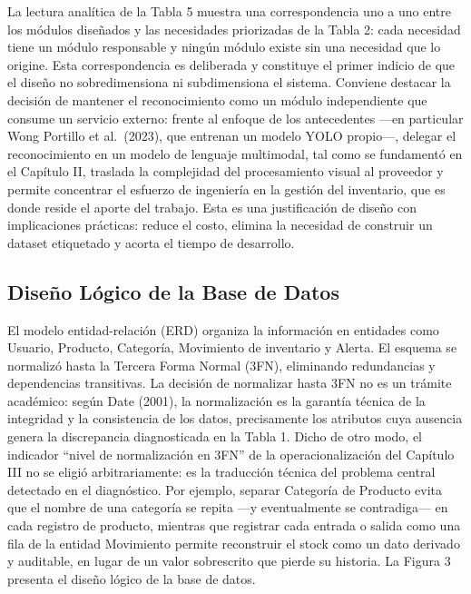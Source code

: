 \documentclass[12pt, letterpaper]{report}
\begin{document}
\vspace{6pt}

La lectura analítica de la Tabla 5 muestra una correspondencia uno a
uno entre los módulos diseñados y las necesidades priorizadas de la
Tabla 2: cada necesidad tiene un módulo responsable y ningún módulo
existe sin una necesidad que lo origine. Esta correspondencia es
deliberada y constituye el primer indicio de que el diseño no
sobredimensiona ni subdimensiona el sistema. Conviene destacar la
decisión de mantener el reconocimiento como un módulo independiente que
consume un servicio externo: frente al enfoque de los antecedentes
---en particular Wong Portillo et al.\ (2023), que entrenan un modelo
YOLO propio---, delegar el reconocimiento en un modelo de lenguaje
multimodal, tal como se fundamentó en el Capítulo II, traslada la
complejidad del procesamiento visual al proveedor y permite concentrar
el esfuerzo de ingeniería en la gestión del inventario, que es donde
reside el aporte del trabajo. Esta es una justificación de diseño con
implicaciones prácticas: reduce el costo, elimina la necesidad de
construir un dataset etiquetado y acorta el tiempo de desarrollo.

\subsection{Diseño Lógico de la Base de Datos}

El modelo entidad-relación (ERD) organiza la información en entidades
como Usuario, Producto, Categoría, Movimiento de inventario y Alerta.
El esquema se normalizó hasta la Tercera Forma Normal (3FN),
eliminando redundancias y dependencias transitivas. La decisión de
normalizar hasta 3FN no es un trámite académico: según Date (2001), la
normalización es la garantía técnica de la integridad y la consistencia
de los datos, precisamente los atributos cuya ausencia genera la
discrepancia diagnosticada en la Tabla 1. Dicho de otro modo, el
indicador ``nivel de normalización en 3FN'' de la operacionalización
del Capítulo III no se eligió arbitrariamente: es la traducción técnica
del problema central detectado en el diagnóstico. Por ejemplo, separar
Categoría de Producto evita que el nombre de una categoría se repita
---y eventualmente se contradiga--- en cada registro de producto,
mientras que registrar cada entrada o salida como una fila de la
entidad Movimiento permite reconstruir el stock como un dato derivado
y auditable, en lugar de un valor sobrescrito que pierde su historia.
La Figura 3 presenta el diseño lógico de la base de datos.
\end{document}
